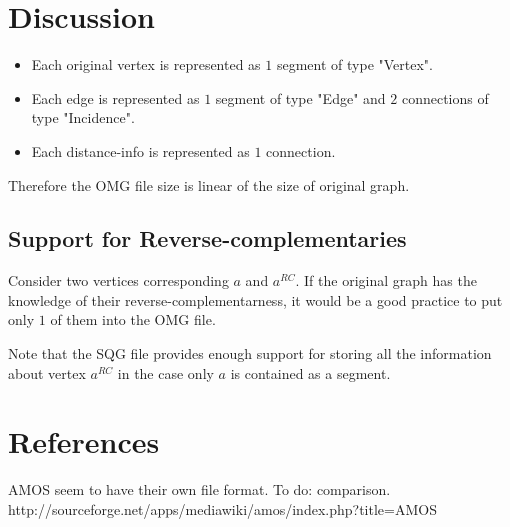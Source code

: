 \documentclass[12pt]{article}
\begin{document}
\section{Discussion}

\begin{itemize}
\item Each original vertex is represented as $1$ segment of type "Vertex".
\item Each edge is represented as $1$ segment of type "Edge" and $2$ connections of type "Incidence".
\item Each distance-info is represented as $1$ connection.
\end{itemize}

Therefore the OMG file size is linear of the size of original graph.

\subsection{Support for Reverse-complementaries}

Consider two vertices corresponding $a$ and $a^{RC}$.
If the original graph has the knowledge of their reverse-complementarness,
it would be a good practice to put only $1$ of them into the OMG file.

Note that the SQG file provides enough support for storing all the information about
vertex $a^{RC}$ in the case only $a$ is contained as a segment.

\section{References}

AMOS seem to have their own file format. To do: comparison.\\
http://sourceforge.net/apps/mediawiki/amos/index.php?title=AMOS
\end{document}
